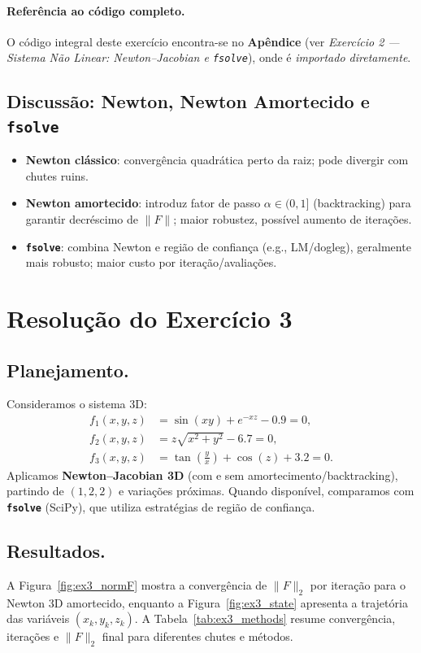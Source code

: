 \documentclass[12pt,a4paper]{article}
\begin{document}
\paragraph{Referência ao código completo.}
O código integral deste exercício encontra-se no \textbf{Apêndice} (ver \emph{Exercício 2 — Sistema Não Linear: Newton--Jacobian e \texttt{fsolve}}), 
onde é \emph{importado diretamente}.


\subsection*{Discussão: Newton, Newton Amortecido e \texttt{fsolve}}
\begin{itemize}
  \item \textbf{Newton clássico}: convergência quadrática perto da raiz; pode divergir com chutes ruins.
  \item \textbf{Newton amortecido}: introduz fator de passo $\alpha\in(0,1]$ (backtracking) para garantir decréscimo de $\|F\|$; maior robustez, possível aumento de iterações.
  \item \textbf{\texttt{fsolve}}: combina Newton e região de confiança (e.g., LM/dogleg), geralmente mais robusto; maior custo por iteração/avaliações.
\end{itemize}


\section{Resolução do Exercício 3}

\subsection{Planejamento.}
Consideramos o sistema 3D:
\begin{align*}
f_1(x,y,z) &= \sin(xy) + e^{-xz} - 0.9 = 0,\\
f_2(x,y,z) &= z\sqrt{x^2 + y^2} - 6.7 = 0,\\
f_3(x,y,z) &= \tan\!\left(\frac{y}{x}\right) + \cos(z) + 3.2 = 0.
\end{align*}
Aplicamos \textbf{Newton--Jacobian 3D} (com e sem amortecimento/backtracking), partindo de $(1,2,2)$ e variações próximas.
Quando disponível, comparamos com \textbf{\texttt{fsolve}} (SciPy), que utiliza estratégias de região de confiança.

\subsection{Resultados.}
A Figura~\ref{fig:ex3_normF} mostra a convergência de $\|F\|_2$ por iteração para o Newton 3D amortecido, enquanto a Figura~\ref{fig:ex3_state} apresenta a trajetória das variáveis $(x_k,y_k,z_k)$. A Tabela~\ref{tab:ex3_methods} resume convergência, iterações e $\|F\|_2$ final para diferentes chutes e métodos.
\end{document}
